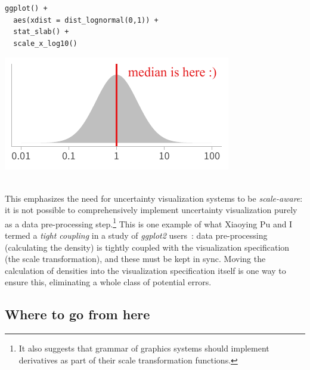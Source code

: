 \documentclass[journal]{vgtc}                     %
\begin{document}
\noindent
\begin{minipage}{.5\columnwidth}
\small
\begin{verbatim}
ggplot() +
  aes(xdist = dist_lognormal(0,1)) +
  stat_slab() +
  scale_x_log10()
\end{verbatim}
\end{minipage}%
  \begin{minipage}{.4\columnwidth}
    \centering
    \includegraphics[width=1.2\columnwidth]{figs/3-jacobian-correct.pdf}
  \end{minipage}
\vspace{.5\belowdisplayskip}\\
This emphasizes the need for uncertainty visualization systems to be \textit{scale-aware}: it is not possible to comprehensively implement uncertainty visualization purely as a data pre-processing step.\footnote{It also suggests that grammar of graphics systems should implement derivatives as part of their scale transformation functions.} This is one example of what Xiaoying Pu and I
termed a \textit{tight coupling} in a study of \textit{ggplot2} users~\cite{pu2023inpractice}: data pre-processing (calculating the density) is tightly coupled with the visualization specification (the scale transformation), and these must be kept in sync. Moving the calculation of densities into the visualization specification itself is one way to ensure this, eliminating a whole class of potential errors. 


\subsection{Where to go from here}
\end{document}
